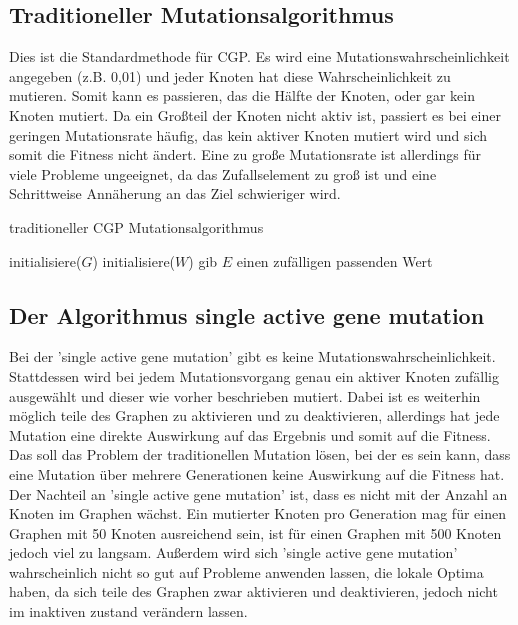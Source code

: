 \subsection{Traditioneller Mutationsalgorithmus}

Dies ist die Standardmethode für CGP. Es wird eine Mutationswahrscheinlichkeit angegeben (z.B. 0,01) und jeder Knoten hat diese Wahrscheinlichkeit zu mutieren. Somit kann es passieren, das die Hälfte der Knoten, oder gar kein Knoten mutiert. Da ein Großteil der Knoten nicht aktiv ist, passiert es bei einer geringen Mutationsrate häufig, das kein aktiver Knoten mutiert wird und sich somit die Fitness nicht ändert. Eine zu große Mutationsrate ist allerdings für viele Probleme ungeeignet, da das Zufallselement zu groß ist und eine Schrittweise Annäherung an das Ziel schwieriger wird.


\begin{algorithm}
\caption{traditioneller CGP Mutationsalgorithmus}
\begin{algorithmic}[1]
   \State initialisiere($G$) 
   \State initialisiere($W$) 
    
        
          \State \textnormal{gib $E$ einen zufälligen passenden Wert} 
      \EndIf
   \EndFor
\EndProcedure
\end{algorithmic}
\end{algorithm}

\subsection{Der Algorithmus single active gene mutation}

Bei der 'single active gene mutation' gibt es keine Mutationswahrscheinlichkeit. Stattdessen wird bei jedem Mutationsvorgang genau ein aktiver Knoten zufällig ausgewählt und dieser wie vorher beschrieben mutiert. Dabei ist es weiterhin möglich teile des Graphen zu aktivieren und zu deaktivieren, allerdings hat jede Mutation eine direkte Auswirkung auf das Ergebnis und somit auf die Fitness. Das soll das Problem der traditionellen Mutation lösen, bei der es sein kann, dass eine Mutation über mehrere Generationen keine Auswirkung auf die Fitness hat. Der Nachteil an 'single active gene mutation' ist, dass es nicht mit der Anzahl an Knoten im Graphen wächst. Ein mutierter Knoten pro Generation mag für einen Graphen mit 50 Knoten ausreichend sein, ist für einen Graphen mit 500 Knoten jedoch viel zu langsam. Außerdem wird sich 'single active gene mutation' wahrscheinlich nicht so gut auf Probleme anwenden lassen, die lokale Optima haben, da sich teile des Graphen zwar aktivieren und deaktivieren, jedoch nicht im inaktiven zustand verändern lassen.

